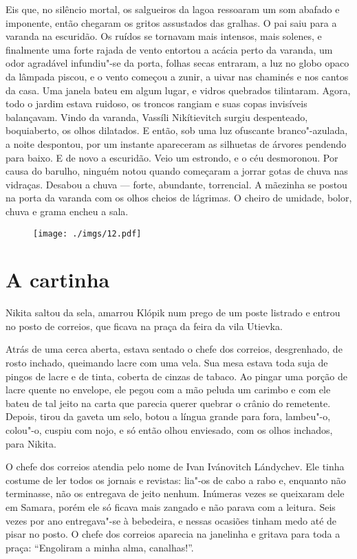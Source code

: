 Eis que, no silêncio mortal, os salgueiros da lagoa ressoaram um som
abafado e imponente, então chegaram os gritos assustados das gralhas. O
pai saiu para a varanda na escuridão. Os ruídos se tornavam mais
intensos, mais solenes, e finalmente uma forte rajada de vento entortou
a acácia perto da varanda, um odor agradável infundiu"-se da porta,
folhas secas entraram, a luz no globo opaco da lâmpada piscou, e o vento
começou a zunir, a uivar nas chaminés e nos cantos da casa. Uma janela
bateu em algum lugar, e vidros quebrados tilintaram. Agora, todo o
jardim estava ruidoso, os troncos rangiam e suas copas invisíveis
balançavam. Vindo da varanda, Vassíli Nikítievitch surgiu despenteado,
boquiaberto, os olhos dilatados. E então, sob uma luz ofuscante
branco"-azulada, a noite despontou, por um instante apareceram as
silhuetas de árvores pendendo para baixo. E de novo a escuridão. Veio um
estrondo, e o céu desmoronou. Por causa do barulho, ninguém notou quando
começaram a jorrar gotas de chuva nas vidraças. Desabou a chuva ---
forte, abundante, torrencial. A mãezinha se postou na porta da varanda
com os olhos cheios de lágrimas. O cheiro de umidade, bolor,
chuva e grama encheu a sala.

\begin{figure}
\vspace*{-2.65cm}
\hspace*{-3.25cm}\texttt{[image: ./imgs/12.pdf]}
\end{figure}

\chapter{A cartinha}

Nikita saltou da sela, amarrou Klópik num prego de um poste listrado e
entrou no posto de correios, que ficava na praça da feira da vila
Utievka.

Atrás de uma cerca aberta, estava sentado o chefe dos correios,
desgrenhado, de rosto inchado, queimando lacre com uma vela. Sua mesa
estava toda suja de pingos de lacre e de tinta, coberta de cinzas de
tabaco. Ao pingar uma porção de lacre quente no envelope, ele pegou com
a mão peluda um carimbo e com ele bateu de tal jeito na carta que
parecia querer quebrar o crânio do remetente. Depois, tirou da gaveta um
selo, botou a língua grande para fora, lambeu"-o, colou"-o, cuspiu com
nojo, e só então olhou enviesado, com os olhos inchados, para Nikita.

O chefe dos correios atendia pelo nome de Ivan Ivánovitch Lándychev. Ele
tinha costume de ler todos os jornais e revistas: lia"-os de cabo a rabo
e, enquanto não terminasse, não os entregava de jeito nenhum. Inúmeras
vezes se queixaram dele em Samara, porém ele só ficava mais zangado e
não parava com a leitura. Seis vezes por ano entregava"-se à bebedeira,
e nessas ocasiões tinham medo até de pisar no posto. O chefe dos
correios aparecia na janelinha e gritava para toda a praça: ``Engoliram
a minha alma, canalhas!''.

